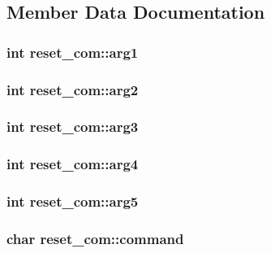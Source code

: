 \subsection{Member Data Documentation}
\hypertarget{structreset__com_a635a6d7d405f9fda34d53803b48cc652}{
\subsubsection[{arg1}]{\setlength{\rightskip}{0pt plus 5cm}int reset\-\_\-com\-::arg1}}\label{structreset__com_a635a6d7d405f9fda34d53803b48cc652}
\hypertarget{structreset__com_a413552875fa3046ab670a408918494e1}{
\subsubsection[{arg2}]{\setlength{\rightskip}{0pt plus 5cm}int reset\-\_\-com\-::arg2}}\label{structreset__com_a413552875fa3046ab670a408918494e1}
\hypertarget{structreset__com_abe997d85fe29ad69fced2bd95be362f7}{
\subsubsection[{arg3}]{\setlength{\rightskip}{0pt plus 5cm}int reset\-\_\-com\-::arg3}}\label{structreset__com_abe997d85fe29ad69fced2bd95be362f7}
\hypertarget{structreset__com_ae37b00076aad4228e62e64d9381faa2b}{
\subsubsection[{arg4}]{\setlength{\rightskip}{0pt plus 5cm}int reset\-\_\-com\-::arg4}}\label{structreset__com_ae37b00076aad4228e62e64d9381faa2b}
\hypertarget{structreset__com_aabf92f34a2d4a1bc0bb0a8fd06815fb6}{
\subsubsection[{arg5}]{\setlength{\rightskip}{0pt plus 5cm}int reset\-\_\-com\-::arg5}}\label{structreset__com_aabf92f34a2d4a1bc0bb0a8fd06815fb6}
\hypertarget{structreset__com_a6cca09d17ef8ba4765b1bddfe1cb6e31}{
\subsubsection[{command}]{\setlength{\rightskip}{0pt plus 5cm}char reset\-\_\-com\-::command}}\label{structreset__com_a6cca09d17ef8ba4765b1bddfe1cb6e31}
